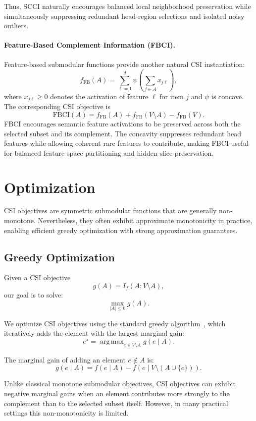\documentclass[11pt]{article}
\DeclareMathOperator*{\argmax}{arg\,max}
\begin{document}
Thus, SCCI naturally encourages balanced local neighborhood preservation while simultaneously suppressing redundant head-region selections and isolated noisy outliers.

\paragraph{Feature-Based Complement Information (FBCI).}
Feature-based submodular functions provide another natural CSI instantiation:
\[
f_{\text{FB}}(A)
=
\sum_{\ell=1}^d
\psi\left(\sum_{j\in A} x_{j\ell}\right),
\]
where $x_{j\ell}\ge 0$ denotes the activation of feature $\ell$ for item $j$ and $\psi$ is concave. The corresponding CSI objective is
\[
\text{FBCI}(A)
=
f_{\text{FB}}(A)
+
f_{\text{FB}}(V\setminus A)
-
f_{\text{FB}}(V).
\]
FBCI encourages semantic feature activations to be preserved across both the selected subset and its complement. The concavity suppresses redundant head features while allowing coherent rare features to contribute, making FBCI useful for balanced feature-space partitioning and hidden-slice preservation.

\section{Optimization}
\label{sec:optimization}

CSI objectives are symmetric submodular functions that are generally non-monotone. Nevertheless, they often exhibit approximate monotonicity in practice, enabling efficient greedy optimization with strong approximation guarantees.

\subsection{Greedy Optimization}

Given a CSI objective
\[
g(A)=I_f(A;V\setminus A),
\]
our goal is to solve:
\[
\max_{|A|\le k} g(A).
\]

We optimize CSI objectives using the standard greedy algorithm~\cite{nemhauser1978analysis}, which iteratively adds the element with the largest marginal gain:
\[
e^\star
=
\argmax_{e\in V\setminus A}
g(e\mid A).
\]

The marginal gain of adding an element $e\notin A$ is:
\[
g(e\mid A)
=
f(e\mid A)
-
f(e\mid V\setminus(A\cup\{e\})).
\]

Unlike classical monotone submodular objectives, CSI objectives can exhibit negative marginal gains when an element contributes more strongly to the complement than to the selected subset itself. However, in many practical settings this non-monotonicity is limited.
\end{document}
